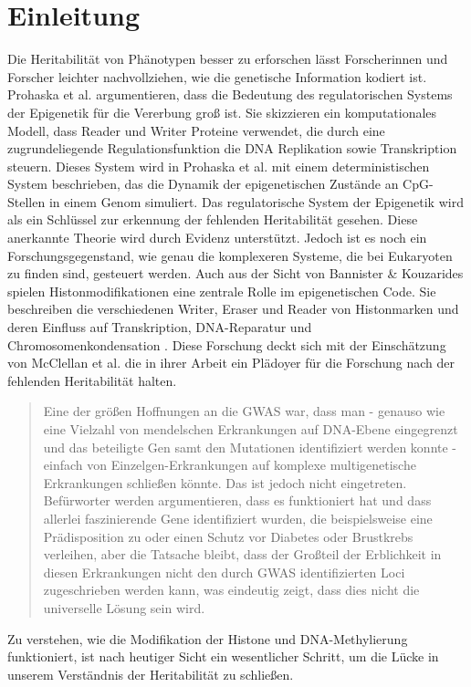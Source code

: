 \documentclass{SeminarV2}
\begin{document}
\section{Einleitung}
Die Heritabilit\"{a}t von Ph\"{a}notypen besser zu erforschen l\"{a}sst Forscherinnen und Forscher leichter
nachvollziehen, wie die genetische Information kodiert ist.
Prohaska et al. argumentieren, dass die Bedeutung des regulatorischen Systems der Epigenetik f\"{u}r die Vererbung gro{\ss} ist.
Sie skizzieren ein komputationales Modell, dass Reader und Writer Proteine verwendet, die durch eine zugrundeliegende Regulationsfunktion die DNA Replikation sowie Transkription steuern.
Dieses System wird in Prohaska et al. mit einem deterministischen System beschrieben, das die Dynamik der epigenetischen Zust\"{a}nde an CpG-Stellen in einem Genom simuliert.
Das regulatorische System der Epigenetik wird als ein Schlüssel zur erkennung der fehlenden Heritabilität gesehen.
Diese anerkannte Theorie wird durch Evidenz unterstützt. Jedoch ist es noch ein Forschungsgegenstand, wie genau die komplexeren Systeme, die bei Eukaryoten zu finden sind, gesteuert werden. \cite{prohaska-2010}
Auch aus der Sicht von Bannister {\&} Kouzarides spielen Histonmodifikationen eine zentrale Rolle im epigenetischen Code. 
Sie beschreiben die verschiedenen Writer, Eraser und Reader von Histonmarken und deren Einfluss auf Transkription, DNA-Reparatur und Chromosomenkondensation \cite{bannister-2011}.  
Diese Forschung deckt sich mit der Einschätzung von McClellan et al.
die in ihrer Arbeit ein Pl\"{a}doyer f\"{u}r die Forschung
nach der fehlenden Heritabilit\"{a}t halten.
\begin{quote}
  \sloppy
  Eine der gr\"{o}{\ss}en Hoffnungen an die GWAS war, dass man - 
  genauso wie eine Vielzahl von mendelschen Erkrankungen auf DNA-Ebene 
  eingegrenzt und das beteiligte Gen samt den Mutationen identifiziert werden konnte - 
  einfach von Einzelgen-Erkrankungen auf komplexe multigenetische Erkrankungen schlie{\ss}en k\"{o}nnte. 
  Das ist jedoch nicht eingetreten. Bef\"{u}rworter werden argumentieren, dass es funktioniert hat 
  und dass allerlei faszinierende Gene identifiziert wurden, die beispielsweise eine Pr\"{a}disposition 
  zu oder einen Schutz vor Diabetes oder Brustkrebs verleihen, aber die Tatsache bleibt, dass der Gro{\ss}teil 
  der Erblichkeit in diesen Erkrankungen nicht den durch GWAS identifizierten Loci zugeschrieben werden 
  kann, was eindeutig zeigt, dass dies nicht die universelle L\"{o}sung sein wird.
  \cite{mcclellan-2010}
\end{quote}
Zu verstehen, wie die Modifikation der Histone und DNA-Methylierung funktioniert, ist nach heutiger Sicht ein wesentlicher Schritt, um die L\"{u}cke in unserem Verst\"{a}ndnis der Heritabilit\"{a}t zu schlie{\ss}en.
\end{document}
